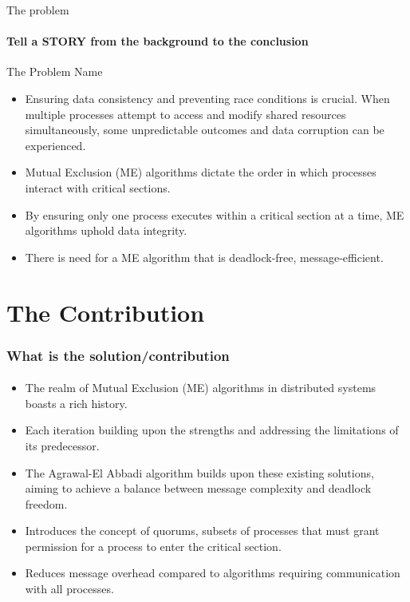 \documentclass[11pt]{beamer}              %
\begin{document}
\begin{frame}{The problem}
\framesubtitle{Tell a \alert{STORY} from the background to the conclusion}

\begin{block}{The Problem Name} 
\begin{itemize}
  \item Ensuring data consistency and preventing race conditions is crucial. When multiple processes attempt to access and modify shared resources simultaneously, some unpredictable outcomes and data corruption can be experienced.
  \item Mutual Exclusion (ME) algorithms dictate the order in which processes interact with critical sections.
  \item By ensuring only one process executes within a critical section at a time, ME algorithms uphold data integrity.
  \item There is need for a ME algorithm that is deadlock-free, message-efficient.
\end{itemize}
\end{block}

\note{}
\end{frame}

\section{The Contribution}
\begin{frame}
\frametitle{What is the solution/contribution}
\framesubtitle{}

\begin{itemize}
  \item The realm of Mutual Exclusion (ME) algorithms in distributed systems boasts a rich history.
  \item Each iteration building upon the strengths and addressing the limitations of its predecessor.
  \item The Agrawal-El Abbadi algorithm builds upon these existing solutions, aiming to achieve a balance between message complexity and deadlock freedom.
  \item Introduces the concept of quorums, subsets of processes that must grant permission for a process to enter the critical section.
  \item Reduces message overhead compared to algorithms requiring communication with all processes.
\end{itemize}

\end{frame}
\end{document}
